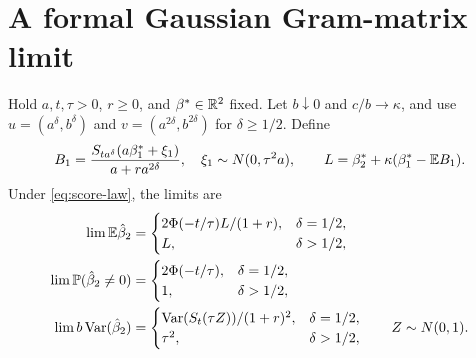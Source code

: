 \section{A formal Gaussian Gram-matrix limit}
\label{sec:formal}

\begin{theorem}
 \label{thm:formal}
 Hold $a,t,\tau > 0$, $r \ge 0$, and $\beta^* \in \mathbb{R}^2$ fixed. Let
 $b \downarrow 0$ and $c/b \to \kappa$, and use $u = (a^\delta,b^\delta)$ and
 $v = (a^{2\delta},b^{2\delta})$ for $\delta \ge 1/2$. Define
 \[
  B_1 = \frac{S_{ta^\delta}(a\beta_1^* + \xi_1)}{a + ra^{2\delta}}, \quad \xi_1
      \sim N(0,\tau^2a),\qquad L
      = \beta_2^* + \kappa(\beta_1^* - \mathbb{E} B_1).
 \]
 Under \eqref{eq:score-law}, the limits are
 \begin{align*}
  \lim\mathbb{E}\hat\beta_2            & = \begin{cases}
                                    2\Phi(-t/\tau)L/(1 + r), & \delta = 1/2, \\
                                    L,                       & \delta > 1/2,
                                   \end{cases} \\
  \lim\mathbb{P}(\hat\beta_2 \ne 0) & = \begin{cases}
                                    2\Phi(-t/\tau), & \delta = 1/2, \\
                                    1,              & \delta > 1/2,
                                   \end{cases} \\
  \lim b\operatorname{Var}(\hat\beta_2)      & = \begin{cases}
                                    \operatorname{Var}(S_t(\tau Z))/(1 + r)^2, & \delta = 1/2, \\
                                    \tau^2,                          & \delta > 1/2,
                                   \end{cases}\qquad Z \sim N(0,1).
 \end{align*}
\end{theorem}
